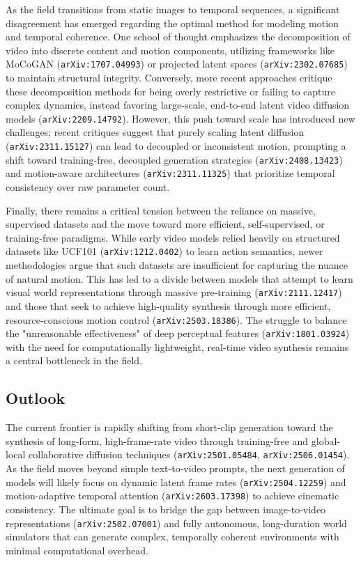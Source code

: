 \documentclass[11pt]{article}
\begin{document}
As the field transitions from static images to temporal sequences, a significant disagreement has emerged regarding the optimal method for modeling motion and temporal coherence. One school of thought emphasizes the decomposition of video into discrete content and motion components, utilizing frameworks like MoCoGAN (\texttt{arXiv:1707.04993}) or projected latent spaces (\texttt{arXiv:2302.07685}) to maintain structural integrity. Conversely, more recent approaches critique these decomposition methods for being overly restrictive or failing to capture complex dynamics, instead favoring large-scale, end-to-end latent video diffusion models (\texttt{arXiv:2209.14792}). However, this push toward scale has introduced new challenges; recent critiques suggest that purely scaling latent diffusion (\texttt{arXiv:2311.15127}) can lead to decoupled or inconsistent motion, prompting a shift toward training-free, decoupled generation strategies (\texttt{arXiv:2408.13423}) and motion-aware architectures (\texttt{arXiv:2311.11325}) that prioritize temporal consistency over raw parameter count.

Finally, there remains a critical tension between the reliance on massive, supervised datasets and the move toward more efficient, self-supervised, or training-free paradigms. While early video models relied heavily on structured datasets like UCF101 (\texttt{arXiv:1212.0402}) to learn action semantics, newer methodologies argue that such datasets are insufficient for capturing the nuance of natural motion. This has led to a divide between models that attempt to learn visual world representations through massive pre-training (\texttt{arXiv:2111.12417}) and those that seek to achieve high-quality synthesis through more efficient, resource-conscious motion control (\texttt{arXiv:2503.18386}). The struggle to balance the "unreasonable effectiveness" of deep perceptual features (\texttt{arXiv:1801.03924}) with the need for computationally lightweight, real-time video synthesis remains a central bottleneck in the field.

\subsection{Outlook}

The current frontier is rapidly shifting from short-clip generation toward the synthesis of long-form, high-frame-rate video through training-free and global-local collaborative diffusion techniques (\texttt{arXiv:2501.05484}, \texttt{arXiv:2506.01454}). As the field moves beyond simple text-to-video prompts, the next generation of models will likely focus on dynamic latent frame rates (\texttt{arXiv:2504.12259}) and motion-adaptive temporal attention (\texttt{arXiv:2603.17398}) to achieve cinematic consistency. The ultimate goal is to bridge the gap between image-to-video representations (\texttt{arXiv:2502.07001}) and fully autonomous, long-duration world simulators that can generate complex, temporally coherent environments with minimal computational overhead.
\end{document}
